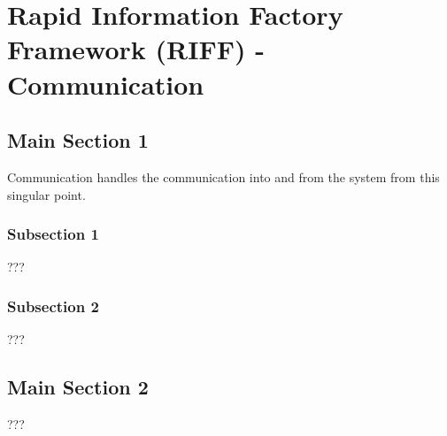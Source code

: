 
\chapter{Rapid Information Factory Framework (RIFF) - Communication} %

\label{Chapter26} %



\section{Main Section 1}

Communication handles the communication into and from the system from this singular point.

\subsection{Subsection 1}

???


\subsection{Subsection 2}

???


\section{Main Section 2}

???
